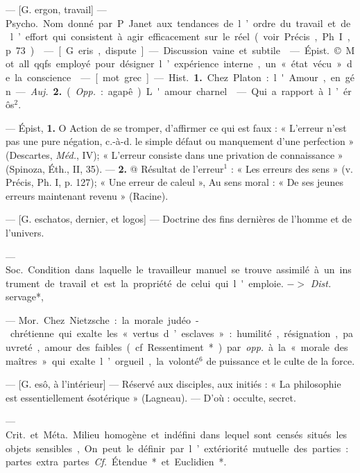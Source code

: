 \begin{itemize}[leftmargin=1cm, label=, itemsep=1pt]
 — [G. ergon,
travail] — \si{Psycho.} Nom donné par
P. Janet aux tendances de l’ordre
du travail et de l’effort qui consistent à agir efficacement sur le réel
(voir Précis, Ph. I, p. 73).

 — [G. eris, dispute] — Discussion vaine et subtile.

 — \si{Épist.} © Mot all. qqfs
employé pour désigner l’expérience
interne, un « état vécu » de la conscience.

 — [mot grec] — \si{Hist.} {\bf 1.} Chez
Platon : l'Amour, en gén. — {\it Auj.}
 {\bf 2.} ({\it Opp.} : agapê). L'amour charnel.

 — Qui a rapport à l’érôs$^2$.

 — Épist, {\bf 1.} O Action de se
tromper, d'affirmer ce qui est faux :
« L'erreur n’est pas une pure négation, c.-à-d. le simple défaut ou
manquement d'une perfection »
(Descartes, \si{{\it Méd.}}, IV); « L'erreur
consiste dans une privation de connaissance » (Spinoza, Éth., II, 35).
— {\bf 2.} @ Résultat de l'erreur$^1$ : « Les
erreurs des sens » (v. Précis, Ph. I,
p. 127); « Une erreur de caleul », Au
sens moral : « De ses jeunes erreurs
maintenant revenu » (Racine).

 — [G. eschatos, dernier, et
logos] — Doctrine des fins dernières de l’homme et de l'univers.

 — \si{Soc.} Condition dans laquelle le travailleur manuel se
trouve assimilé à un instrument de
travail et est la propriété de celui
qui l'emploie. $->$ {\it Dist.} servage*,

 — \si{Mor.} Chez
Nietzsche : la morale judéo-chrétienne qui exalte les « vertus d’esclaves » : humilité, résignation, pauvreté, amour des faibles (cf. Ressentiment*) par {\it opp.} à la « morale des
maîtres » qui exalte l’orgueil, la
volonté$^6$ de puissance et le culte de
la force.

 — [G. esô, à l'intérieur] —
Réservé aux disciples, aux initiés :
« La philosophie est essentiellement
ésotérique » (Lagneau). — D'où :
occulte, secret.

 — \si{Crit.} et \si{Méta.} Milieu homogène et indéfini dans lequel sont
censés situés les objets sensibles, On
peut le définir par l’extériorité mutuelle des parties : partes extra partes. {\it Cf.} Étendue* et Euclidien*.


\end{itemize}
